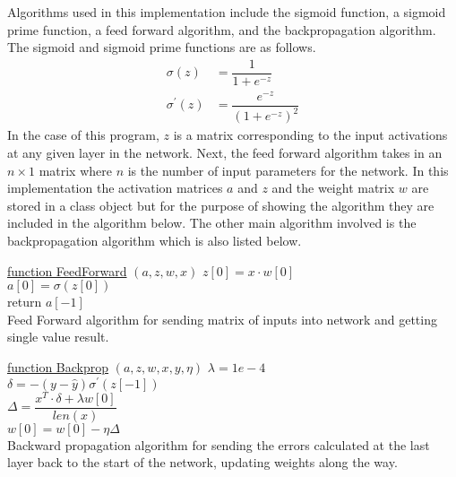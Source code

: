 \documentclass{article}
\theoremstyle{plain} %
\theoremstyle{definition} %
\theoremstyle{plain} %
\begin{document}
Algorithms used in this implementation include the sigmoid function, a sigmoid prime function, a feed forward algorithm, and the backpropagation algorithm. The sigmoid and sigmoid prime functions are as follows.
\begin{align}
\sigma(z) &= \dfrac{1}{1+e^{-z}}\\
\sigma^\prime(z) &= \dfrac{e^{-z}}{\left( 1+e^{-z} \right)^2}
\end{align}
In the case of this program, $z$ is a matrix corresponding to the input activations at any given layer in the network.
Next, the feed forward algorithm takes in an $n\times 1$ matrix where $n$ is the number of input parameters for the network. In this implementation the activation matrices $a$ and $z$ and the weight matrix $w$ are stored in a class object but for the purpose of showing the algorithm they are included in the algorithm below. The other main algorithm involved is the backpropagation algorithm which is also listed below.
\begin{algorithm}[H]

    \underline{function FeedForward} $(a, z, w, x)$\;
    $z[0] = x \cdot w[0]$\\
    $a[0] = \sigma(z[0])$\\
    return $a[-1]$\\
    \caption{Feed Forward algorithm for sending matrix of inputs into network and getting single value result.}
\end{algorithm}
\begin{algorithm}[H]
    \underline{function Backprop} $(a, z, w, x, y, \eta)$\;
    $\lambda = 1e-4$\\
    $\delta = -(y-\hat{y}) \sigma^\prime(z[-1])$\\
    $\Delta = \dfrac{x^T\cdot\delta + \lambda w[0]}{len(x)}$\\
    $w[0] = w[0] - \eta\Delta$\\
    \caption{Backward propagation algorithm for sending the errors calculated at the last layer back to the start of the network, updating weights along the way.}
\end{algorithm}
\end{document}
